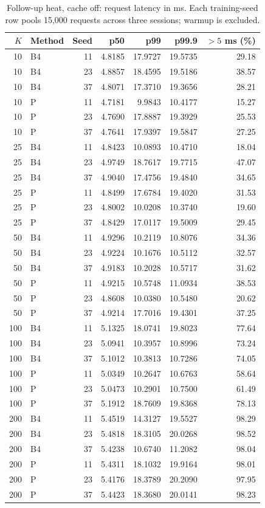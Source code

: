 \begin{table}[ht]
\centering\small
\caption{Follow-up heat, cache off: request latency in ms. Each training-seed row pools 15,000 requests across three sessions; warmup is excluded.}\label{tab:e2_seed_heat_off}
\begin{tabular}{@{}rlrrrrr@{}}\toprule
$K$ & Method & Seed & p50 & p99 & p99.9 & $>5$ ms (\%)\\\midrule
10 & B4 & 11 & 4.8185 & 17.9727 & 19.5735 & 29.18\\
10 & B4 & 23 & 4.8857 & 18.4595 & 19.5186 & 38.57\\
10 & B4 & 37 & 4.8071 & 17.3710 & 19.3656 & 28.21\\
10 & P & 11 & 4.7181 & 9.9843 & 10.4177 & 15.27\\
10 & P & 23 & 4.7690 & 17.8887 & 19.3929 & 25.53\\
10 & P & 37 & 4.7641 & 17.9397 & 19.5847 & 27.25\\
25 & B4 & 11 & 4.8423 & 10.0893 & 10.4710 & 18.04\\
25 & B4 & 23 & 4.9749 & 18.7617 & 19.7715 & 47.07\\
25 & B4 & 37 & 4.9040 & 17.4756 & 19.4840 & 34.65\\
25 & P & 11 & 4.8499 & 17.6784 & 19.4020 & 31.53\\
25 & P & 23 & 4.8002 & 10.0208 & 10.3740 & 19.60\\
25 & P & 37 & 4.8429 & 17.0117 & 19.5009 & 29.45\\
50 & B4 & 11 & 4.9296 & 10.2119 & 10.8076 & 34.36\\
50 & B4 & 23 & 4.9224 & 10.1676 & 10.5112 & 32.57\\
50 & B4 & 37 & 4.9183 & 10.2028 & 10.5717 & 31.62\\
50 & P & 11 & 4.9215 & 10.5748 & 11.0934 & 38.53\\
50 & P & 23 & 4.8608 & 10.0380 & 10.5480 & 20.62\\
50 & P & 37 & 4.9214 & 17.7016 & 19.4301 & 37.25\\
100 & B4 & 11 & 5.1325 & 18.0741 & 19.8023 & 77.64\\
100 & B4 & 23 & 5.0941 & 10.3957 & 10.8996 & 73.24\\
100 & B4 & 37 & 5.1012 & 10.3813 & 10.7286 & 74.05\\
100 & P & 11 & 5.0349 & 10.2647 & 10.6763 & 58.64\\
100 & P & 23 & 5.0473 & 10.2901 & 10.7500 & 61.49\\
100 & P & 37 & 5.1912 & 18.7609 & 19.8368 & 78.13\\
200 & B4 & 11 & 5.4519 & 14.3127 & 19.5527 & 98.29\\
200 & B4 & 23 & 5.4818 & 18.3105 & 20.0268 & 98.52\\
200 & B4 & 37 & 5.4238 & 10.6740 & 11.2082 & 98.04\\
200 & P & 11 & 5.4311 & 18.1032 & 19.9164 & 98.01\\
200 & P & 23 & 5.4176 & 18.3789 & 20.2090 & 97.95\\
200 & P & 37 & 5.4423 & 18.3680 & 20.0141 & 98.23\\
\bottomrule\end{tabular}
\end{table}

